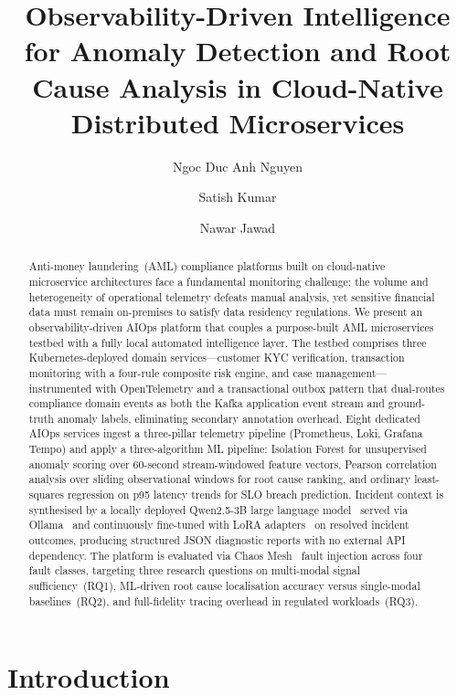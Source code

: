 \documentclass[a4paper,anonymous,UKenglish]{lipics-v2021}
\title{Observability-Driven Intelligence for Anomaly Detection and Root Cause
Analysis in Cloud-Native Distributed Microservices}
\author{Ngoc Duc Anh Nguyen}
       {School of Built Environment, Engineering and Computing,
        Leeds Beckett University, Leeds, UK}
       {n.nguyen3896@leedsbeckett.ac.uk}
       {}{}
\author{Satish Kumar}
       {School of Built Environment, Engineering and Computing,
        Leeds Beckett University, Leeds, UK}
       {s.kumar@leedsbeckett.ac.uk}
       {}{}
\author{Nawar Jawad}
       {School of Built Environment, Engineering and Computing,
        Leeds Beckett University, Leeds, UK}
       {n.nawar@leedsbeckett.ac.uk}
       {}{}
\begin{document}
\maketitle

\begin{abstract}
Anti-money laundering~(AML) compliance platforms built on cloud-native
microservice architectures face a fundamental monitoring challenge: the volume
and heterogeneity of operational telemetry defeats manual analysis, yet
sensitive financial data must remain on-premises to satisfy data residency
regulations. We present an observability-driven AIOps platform that couples a
purpose-built AML microservices testbed with a fully local automated
intelligence layer. The testbed comprises three Kubernetes-deployed domain
services---customer KYC verification, transaction monitoring with a four-rule
composite risk engine, and case management---instrumented with OpenTelemetry
and a transactional outbox pattern that dual-routes compliance domain events as
both the Kafka application event stream and ground-truth anomaly labels,
eliminating secondary annotation overhead. Eight dedicated AIOps services
ingest a three-pillar telemetry pipeline (Prometheus, Loki, Grafana Tempo) and
apply a three-algorithm ML pipeline: Isolation Forest for unsupervised anomaly
scoring over 60-second stream-windowed feature vectors, Pearson correlation
analysis over sliding observational windows for root cause ranking, and
ordinary least-squares regression on p95 latency trends for SLO breach
prediction. Incident context is synthesised by a locally deployed Qwen2.5-3B
large language model~\cite{qwen2024} served via Ollama~\cite{ollama2023} and
continuously fine-tuned with LoRA adapters~\cite{hu2022lora} on resolved
incident outcomes, producing structured JSON diagnostic reports with no
external API dependency. The platform is evaluated via Chaos
Mesh~\cite{chaosmesh2020} fault injection across four fault classes, targeting
three research questions on multi-modal signal sufficiency~(RQ1), ML-driven
root cause localisation accuracy versus single-modal baselines~(RQ2), and
full-fidelity tracing overhead in regulated workloads~(RQ3).
\end{abstract}

\section{Introduction}
\label{sec:introduction}
\end{document}
